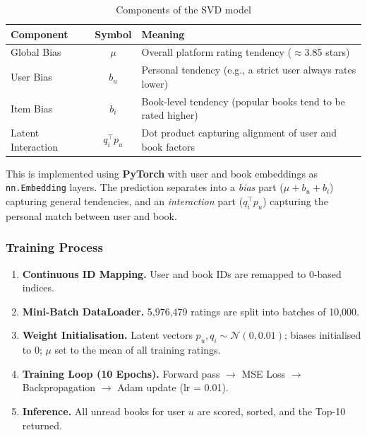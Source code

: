 \documentclass[12pt, a4paper]{article}
\begin{document}
\begin{table}[H]
  \centering
  \caption{Components of the SVD model}
  \label{tab:svd_components}
  \begin{tabular}{|l|c|p{7.5cm}|}
    \hline
    \textbf{Component}     & \textbf{Symbol}              & \textbf{Meaning} \\
    \hline
    Global Bias            & $\mu$                        & Overall platform rating tendency ($\approx$3.85 stars) \\
    \hline
    User Bias              & $b_u$                        & Personal tendency (e.g., a strict user always rates lower) \\
    \hline
    Item Bias              & $b_i$                        & Book-level tendency (popular books tend to be rated higher) \\
    \hline
    Latent Interaction     & ${q}_i^\top {p}_u$ & Dot product capturing alignment of user and book factors \\
    \hline
  \end{tabular}
\end{table}

This is implemented using \textbf{PyTorch} with user and book embeddings as \texttt{nn.Embedding} layers.
The prediction separates into a \textit{bias} part ($\mu + b_u + b_i$) capturing general tendencies,
and an \textit{interaction} part (${q}_i^\top {p}_u$) capturing the personal match between user and book.

\subsubsection{Training Process}

\begin{enumerate}
  \item \textbf{Continuous ID Mapping.} User and book IDs are remapped to 0-based indices.
  \item \textbf{Mini-Batch DataLoader.} 5,976,479 ratings are split into batches of 10,000.
  \item \textbf{Weight Initialisation.}
        Latent vectors ${p}_u, {q}_i \sim \mathcal{N}(0, 0.01)$;
        biases initialised to 0; $\mu$ set to the mean of all training ratings.
  \item \textbf{Training Loop (10 Epochs).}
        Forward pass $\rightarrow$ MSE Loss $\rightarrow$
        Backpropagation $\rightarrow$ Adam update (lr = 0.01).
  \item \textbf{Inference.}
        All unread books for user $u$ are scored, sorted, and the Top-10 returned.
\end{enumerate}
\end{document}
